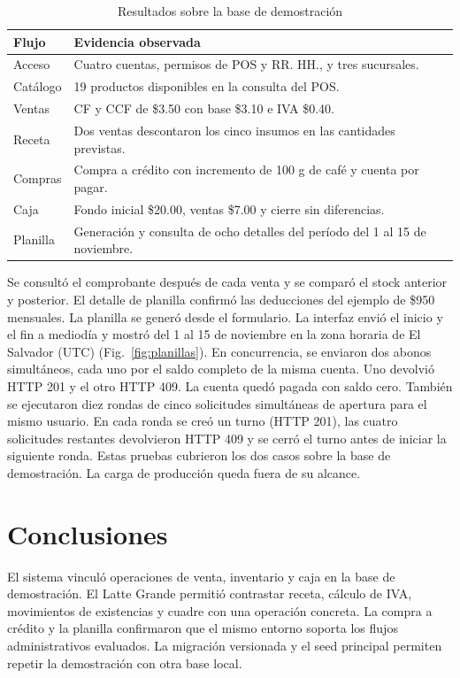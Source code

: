 \documentclass[conference,letterpaper]{IEEEtran}
\begin{document}
\begin{table}[!t]
\caption{Resultados sobre la base de demostración}
\label{tab:resultados}
\centering
\footnotesize
\begin{tabular}{@{}p{}p{}@{}}
\hline
Flujo & Evidencia observada \\
\hline
Acceso & Cuatro cuentas, permisos de POS y RR. HH., y tres sucursales. \\
Catálogo & 19 productos disponibles en la consulta del POS. \\
Ventas & CF y CCF de \$3.50 con base \$3.10 e IVA \$0.40. \\
Receta & Dos ventas descontaron los cinco insumos en las cantidades previstas. \\
Compras & Compra a crédito con incremento de 100 g de café y cuenta por pagar. \\
Caja & Fondo inicial \$20.00, ventas \$7.00 y cierre sin diferencias. \\
Planilla & Generación y consulta de ocho detalles del período del 1 al 15 de noviembre. \\
\hline
\end{tabular}
\end{table}

Se consultó el comprobante después de cada venta y se comparó el stock anterior y posterior. El detalle de planilla confirmó las deducciones del ejemplo de \$950 mensuales. La planilla se generó desde el formulario. La interfaz envió el inicio y el fin a mediodía y mostró del 1 al 15 de noviembre en la zona horaria de El Salvador (UTC) (Fig.~\ref{fig:planillas}). En concurrencia, se enviaron dos abonos simultáneos, cada uno por el saldo completo de la misma cuenta. Uno devolvió HTTP 201 y el otro HTTP 409. La cuenta quedó pagada con saldo cero. También se ejecutaron diez rondas de cinco solicitudes simultáneas de apertura para el mismo usuario. En cada ronda se creó un turno (HTTP 201), las cuatro solicitudes restantes devolvieron HTTP 409 y se cerró el turno antes de iniciar la siguiente ronda. Estas pruebas cubrieron los dos casos sobre la base de demostración. La carga de producción queda fuera de su alcance.

\section{Conclusiones}
El sistema vinculó operaciones de venta, inventario y caja en la base de demostración. El Latte Grande permitió contrastar receta, cálculo de IVA, movimientos de existencias y cuadre con una operación concreta. La compra a crédito y la planilla confirmaron que el mismo entorno soporta los flujos administrativos evaluados. La migración versionada y el seed principal permiten repetir la demostración con otra base local.
\end{document}

